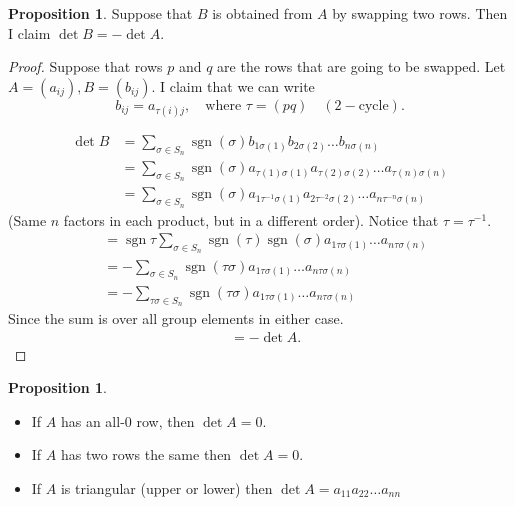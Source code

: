 \documentclass{article}
\theoremstyle{definition}
\newtheorem{proposition}[theorem]{Proposition}
\DeclareMathOperator{\sgn}{sgn}
\begin{document}
\begin{proposition}
  \label{prp:swaprows}
  Suppose that $B$ is obtained from $A$ by swapping two rows. Then I claim $\det B = -\det A$.
\end{proposition}

  \begin{proof}
    Suppose that rows $p$ and $q$ are the rows that are going to be swapped. Let $A=(a_{ij}),B=(b_{ij})$. I claim that we can write 
    \[
    b_{ij} = a_{\tau (i) j}, \quad\text{where }\tau = (pq) \quad (2-\text{cycle}).\]

      \begin{align*}
        \det B &= \sum_{\sigma \in S_n} \sgn(\sigma) b_{1\sigma(1)}b_{2\sigma (2)}\dots b_{n \sigma (n)}\\
        &= \sum_{\sigma \in S_n} \sgn(\sigma) a_{\tau(1)\sigma(1)}a_{\tau(2)\sigma (2)}\dots a_{\tau(n) \sigma (n)}\\
        &= \sum_{\sigma \in S_n} \sgn(\sigma) a_{1\tau^{-1}\sigma(1)}a_{2\tau^{-2}\sigma (2)}\dots a_{n\tau^{-n} \sigma (n)}
      \end{align*} (Same $n$ factors in each product, but in a different order). Notice that $\tau = \tau^{-1}$.
      \begin{align*}
        &= \sgn{\tau} \sum_{\sigma \in S_n}\sgn(\tau)\sgn(\sigma)a_{1\tau\sigma(1)}\dots a_{n \tau\sigma(n)} \\
        &= - \sum_{\sigma \in S_n}\sgn(\tau\sigma)a_{1\tau\sigma(1)}\dots a_{n \tau\sigma(n)} \\
        &= - \sum_{\tau\sigma \in S_n}\sgn(\tau\sigma)a_{1\tau\sigma(1)}\dots a_{n \tau\sigma(n)} 
      \end{align*} Since the sum is over all group elements in either case.
      \begin{align*}
        &= -\det A.
      \end{align*}
  \end{proof}

  \begin{proposition}\hfill
    \begin{itemize}
      \item 
    If $A$ has an all-0 row, then $\det A=0$.
  \item
    If $A$ has two rows the same then $\det A=0$.
  \item
    If $A$ is triangular (upper or lower) then $\det A=a_{11}a_{22}\dots a_{nn}$
    \end{itemize}


  \end{proposition}
\end{document}
